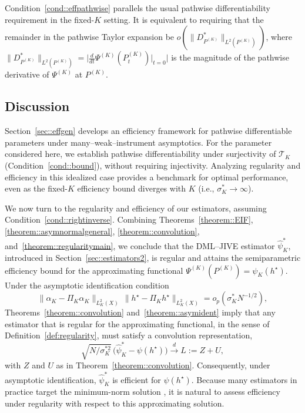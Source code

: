 \documentclass[11pt]{article}
\theoremstyle{plain}
\theoremstyle{definition}
\theoremstyle{remark}
\theoremstyle{definition}
\begin{document}
Condition~\ref{cond::effpathwise} parallels the usual pathwise differentiability requirement in the fixed-\(K\) setting.  
It is equivalent to requiring that the remainder in the pathwise Taylor expansion be \(o(\|D_{P^{(K)}}^*\|_{L^2(P^{(K)})})\),  
where \(\|D_{P^{(K)}}^*\|_{L^2(P^{(K)})} = \bigl|\tfrac{d}{dt}\Psi^{(K)}(P_t^{(K)})\big|_{t=0}\bigr|\)  
is the magnitude of the pathwise derivative of \(\Psi^{(K)}\) at \(P^{(K)}\).

\subsection{Discussion}
\label{sec:efficiencyapp}

Section~\ref{sec::effgen} develops an efficiency framework for pathwise
differentiable parameters under many--weak--instrument asymptotics. For the
parameter considered here, we establish pathwise differentiability under
surjectivity of \(\mathcal{T}_K\) (Condition~\ref{cond::bound}), without
requiring injectivity. Analyzing regularity and efficiency in this idealized
case provides a benchmark for optimal performance, even as the fixed-\(K\)
efficiency bound diverges with \(K\) (i.e., \(\sigma_K^{*} \to \infty\)).

We now turn to the regularity and efficiency of our estimators, assuming
Condition~\ref{cond::rightinverse}. Combining
Theorems~\ref{theorem::EIF}, \ref{theorem::asymnormalgeneral},
\ref{theorem::convolution}, and~\ref{theorem::regularitymain}, we conclude that
the DML--JIVE estimator \(\widehat{\psi}_K^*\), introduced in
Section~\ref{sec::estimators2}, is regular and attains the semiparametric
efficiency bound for the approximating functional
\(\Psi^{(K)}(P^{(K)}) = \psi_K(h^\star)\). Under the asymptotic identification
condition
\[
\|\alpha_K - \Pi_K \alpha_K\|_{L^2_K(X)}\,
\|h^\star - \Pi_K h^\star\|_{L^2_K(X)} = o_p(\sigma_K^* N^{-1/2}),
\]
Theorems~\ref{theorem::convolution} and~\ref{theorem::asymident} imply that any
estimator that is regular for the approximating functional, in the sense of
Definition~\ref{def:regularity}, must satisfy a convolution representation,
\[
\sqrt{N / \sigma_K^{*2}}\,
\bigl(\widehat{\psi}_K^* - \psi(h^\star)\bigr)
\xrightarrow{d} L := Z + U,
\]
with \(Z\) and \(U\) as in Theorem~\ref{theorem::convolution}. Consequently,
under asymptotic identification, \(\widehat{\psi}_K^*\) is efficient for
\(\psi(h^\star)\). Because many estimators in practice target the minimum-norm
solution \citep{babii2017identification, babii2020completeness}, it is natural
to assess efficiency under regularity with respect to this approximating
solution.
\end{document}
